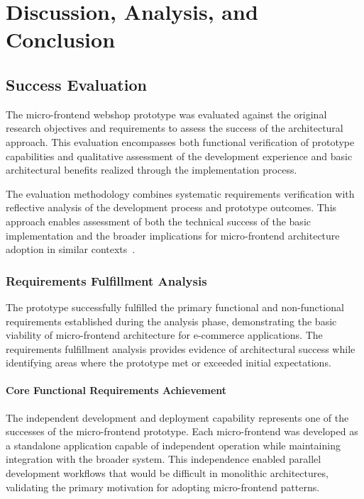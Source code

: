 \documentclass[12pt,a4paper]{report}
\begin{document}
\chapter{Discussion, Analysis, and Conclusion}
\section{Success Evaluation}

The micro-frontend webshop prototype was evaluated against the original research objectives and requirements to assess the success of the architectural approach. This evaluation encompasses both functional verification of prototype capabilities and qualitative assessment of the development experience and basic architectural benefits realized through the implementation process.

The evaluation methodology combines systematic requirements verification with reflective analysis of the development process and prototype outcomes. This approach enables assessment of both the technical success of the basic implementation and the broader implications for micro-frontend architecture adoption in similar contexts~\cite{kitchenham2002case}.

\subsection{Requirements Fulfillment Analysis}

The prototype successfully fulfilled the primary functional and non-functional requirements established during the analysis phase, demonstrating the basic viability of micro-frontend architecture for e-commerce applications. The requirements fulfillment analysis provides evidence of architectural success while identifying areas where the prototype met or exceeded initial expectations.

\subsubsection{Core Functional Requirements Achievement}

The independent development and deployment capability represents one of the successes of the micro-frontend prototype. Each micro-frontend was developed as a standalone application capable of independent operation while maintaining integration with the broader system. This independence enabled parallel development workflows that would be difficult in monolithic architectures, validating the primary motivation for adopting micro-frontend patterns.
\end{document}
